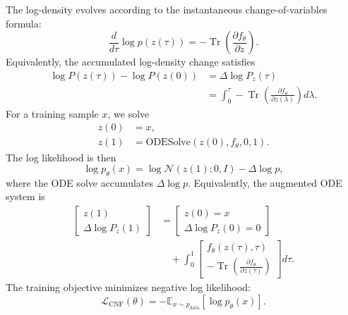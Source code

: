 \documentclass[reprint,amsmath,amssymb,aps,pra,10pt]{revtex4-2}
\begin{document}
The log-density evolves according to the instantaneous change-of-variables formula:
\begin{equation}
    \frac{d}{d\tau}\log p(z(\tau))
    =
    -\operatorname{Tr}
    \left(
        \frac{\partial f_\theta}{\partial z}
    \right).
\end{equation}
Equivalently, the accumulated log-density change satisfies
\begin{align}
    \log P(z(\tau)) - \log P(z(0))
    &=
    \Delta \log P_z(\tau)
    \nonumber \\
    &=
    \int_0^\tau
    -
    \operatorname{Tr}
    \left(
        \frac{\partial f_\theta}{\partial z(\lambda)}
    \right)
    d\lambda.
\end{align}
For a training sample $x$, we solve
\begin{align}
    z(0) &= x, \\
    z(1) &= \mathrm{ODESolve}(z(0), f_\theta, 0, 1).
\end{align}
The log likelihood is then
\begin{equation}
    \log p_\theta(x)
    =
    \log \mathcal{N}(z(1); 0, I)
    -
    \Delta \log p,
    \end{equation}
where the ODE solve accumulates $\Delta \log p$.
Equivalently, the augmented ODE system is
\begin{align}
    \begin{bmatrix}
        z(1) \\
        \Delta \log P_z(1)
    \end{bmatrix}
    &=
    \begin{bmatrix}
        z(0)=x \\
        \Delta \log P_z(0)=0
    \end{bmatrix}
    \nonumber \\
    &\quad
    +
    \int_0^1
    \begin{bmatrix}
        f_\theta(z(\tau),\tau) \\
        -\operatorname{Tr}
        \left(
            \frac{\partial f_\theta}{\partial z(\tau)}
        \right)
    \end{bmatrix}
    d\tau.
\end{align}
The training objective minimizes negative log likelihood:
\begin{equation}
    \mathcal{L}_{\mathrm{CNF}}(\theta)
    =
    -\mathbb{E}_{x \sim p_{\mathrm{data}}}
    \left[
        \log p_\theta(x)
    \right].
\end{equation}
\end{document}

